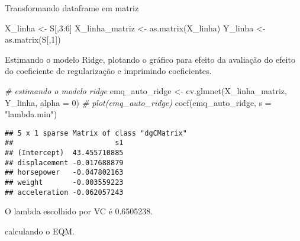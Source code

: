 \documentclass[
]{article}
\newenvironment{Shaded}{\begin{snugshade}}{\end{snugshade}}
\newcommand{\AttributeTok}[1]{\textcolor[rgb]{0.77,0.63,0.00}{#1}}
\newcommand{\CommentTok}[1]{\textcolor[rgb]{0.56,0.35,0.01}{\textit{#1}}}
\newcommand{\DecValTok}[1]{\textcolor[rgb]{0.00,0.00,0.81}{#1}}
\newcommand{\FunctionTok}[1]{\textcolor[rgb]{0.00,0.00,0.00}{#1}}
\newcommand{\NormalTok}[1]{#1}
\newcommand{\OtherTok}[1]{\textcolor[rgb]{0.56,0.35,0.01}{#1}}
\newcommand{\SpecialCharTok}[1]{\textcolor[rgb]{0.00,0.00,0.00}{#1}}
\newcommand{\StringTok}[1]{\textcolor[rgb]{0.31,0.60,0.02}{#1}}
\begin{document}
Transformando dataframe em matriz

\begin{Shaded}
\begin{Highlighting}[]
\NormalTok{X\_linha }\OtherTok{\textless{}{-}}\NormalTok{ S[,}\DecValTok{3}\SpecialCharTok{:}\DecValTok{6}\NormalTok{]}
\NormalTok{X\_linha\_matriz }\OtherTok{\textless{}{-}} \FunctionTok{as.matrix}\NormalTok{(X\_linha)}
\NormalTok{Y\_linha }\OtherTok{\textless{}{-}} \FunctionTok{as.matrix}\NormalTok{(S[,}\DecValTok{1}\NormalTok{])}
\end{Highlighting}
\end{Shaded}

Estimando o modelo Ridge, plotando o gráfico para efeito da avaliação do
efeito do coeficiente de regularização e imprimindo coeficientes.

\begin{Shaded}
\begin{Highlighting}[]
\CommentTok{\# estimando o modelo ridge}
\NormalTok{emq\_auto\_ridge }\OtherTok{\textless{}{-}} \FunctionTok{cv.glmnet}\NormalTok{(X\_linha\_matriz, Y\_linha, }\AttributeTok{alpha =} \DecValTok{0}\NormalTok{) }
\CommentTok{\# plot(emq\_auto\_ridge)}
\FunctionTok{coef}\NormalTok{(emq\_auto\_ridge, }\AttributeTok{s =} \StringTok{"lambda.min"}\NormalTok{)}
\end{Highlighting}
\end{Shaded}

\begin{verbatim}
## 5 x 1 sparse Matrix of class "dgCMatrix"
##                        s1
## (Intercept)  43.455710885
## displacement -0.017688879
## horsepower   -0.047802163
## weight       -0.003559223
## acceleration -0.062057243
\end{verbatim}

\begin{Shaded}
\end{Shaded}

O lambda escolhido por VC é 0.6505238.

calculando o EQM.

\begin{Shaded}
\end{Shaded}
\end{document}
